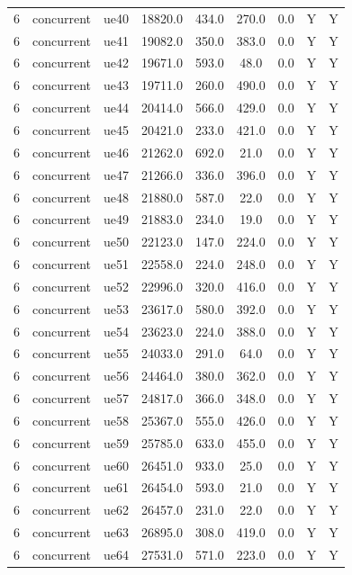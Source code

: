 \begin{table}[ht]
\begin{tabular}{|c|c|c|c|c|c|c|c|c|}
6 & concurrent & ue40 & 18820.0 & 434.0 & 270.0 & 0.0 & Y & Y \\
6 & concurrent & ue41 & 19082.0 & 350.0 & 383.0 & 0.0 & Y & Y \\
6 & concurrent & ue42 & 19671.0 & 593.0 & 48.0 & 0.0 & Y & Y \\
6 & concurrent & ue43 & 19711.0 & 260.0 & 490.0 & 0.0 & Y & Y \\
6 & concurrent & ue44 & 20414.0 & 566.0 & 429.0 & 0.0 & Y & Y \\
6 & concurrent & ue45 & 20421.0 & 233.0 & 421.0 & 0.0 & Y & Y \\
6 & concurrent & ue46 & 21262.0 & 692.0 & 21.0 & 0.0 & Y & Y \\
6 & concurrent & ue47 & 21266.0 & 336.0 & 396.0 & 0.0 & Y & Y \\
6 & concurrent & ue48 & 21880.0 & 587.0 & 22.0 & 0.0 & Y & Y \\
6 & concurrent & ue49 & 21883.0 & 234.0 & 19.0 & 0.0 & Y & Y \\
6 & concurrent & ue50 & 22123.0 & 147.0 & 224.0 & 0.0 & Y & Y \\
6 & concurrent & ue51 & 22558.0 & 224.0 & 248.0 & 0.0 & Y & Y \\
6 & concurrent & ue52 & 22996.0 & 320.0 & 416.0 & 0.0 & Y & Y \\
6 & concurrent & ue53 & 23617.0 & 580.0 & 392.0 & 0.0 & Y & Y \\
6 & concurrent & ue54 & 23623.0 & 224.0 & 388.0 & 0.0 & Y & Y \\
6 & concurrent & ue55 & 24033.0 & 291.0 & 64.0 & 0.0 & Y & Y \\
6 & concurrent & ue56 & 24464.0 & 380.0 & 362.0 & 0.0 & Y & Y \\
6 & concurrent & ue57 & 24817.0 & 366.0 & 348.0 & 0.0 & Y & Y \\
6 & concurrent & ue58 & 25367.0 & 555.0 & 426.0 & 0.0 & Y & Y \\
6 & concurrent & ue59 & 25785.0 & 633.0 & 455.0 & 0.0 & Y & Y \\
6 & concurrent & ue60 & 26451.0 & 933.0 & 25.0 & 0.0 & Y & Y \\
6 & concurrent & ue61 & 26454.0 & 593.0 & 21.0 & 0.0 & Y & Y \\
6 & concurrent & ue62 & 26457.0 & 231.0 & 22.0 & 0.0 & Y & Y \\
6 & concurrent & ue63 & 26895.0 & 308.0 & 419.0 & 0.0 & Y & Y \\
6 & concurrent & ue64 & 27531.0 & 571.0 & 223.0 & 0.0 & Y & Y \\

\end{tabular}
\end{table}
